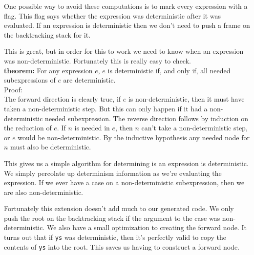 \documentclass{article}
\begin{document}
One possible way to avoid these computations is to mark every expression with a flag.
This flag says whether the expression was deterministic after it was evaluated.
If an expression is deterministic then we don't need to push a frame on the backtracking stack for it.

This is great, but in order for this to work we need to know when an expression was non-deterministic.
Fortunately this is really easy to check.\\
$\ $\\
\textbf{theorem:}
For any expression $e$, $e$ is deterministic if, and only if, all needed subexpressions of $e$ are deterministic.\\
$\ $\\
Proof:\\
The forward direction is clearly true, if $e$ is non-deterministic, then it must have taken a non-deterministic step.
But this can only happen if it had a non-deterministic needed subexpression.
The reverse direction follows by induction on the reduction of $e$.
If $n$ is needed in $e$, then $n$ can't take a non-deterministic step, or $e$ would be non-deterministic.
By the inductive hypothesis any needed node for $n$ must also be deterministic.

This gives us a simple algorithm for determining is an expression is deterministic.
We simply percolate up determinism information as we're evaluating the expression.
If we ever have a case on a non-deterministic subexpression, then we are also non-deterministic.

Fortunately this extension doesn't add much to our generated code.
We only push the root on the backtracking stack if the argument to the case was non-deterministic.
We also have a small optimization to creating the forward node.
It turns out that if \texttt{ys} was deterministic, then it's perfectly valid to copy the
contents of \texttt{ys} into the root.
This saves us having to construct a forward node.
\end{document}
